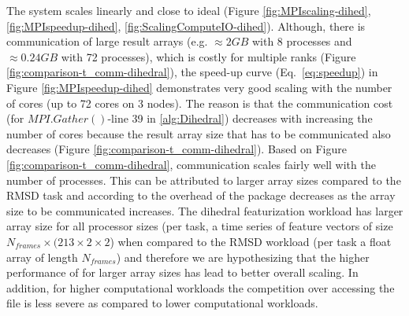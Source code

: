 The system scales linearly and close to ideal (Figure \ref{fig:MPIscaling-dihed}, \ref{fig:MPIspeedup-dihed}, \ref{fig:ScalingComputeIO-dihed}). Although, there is communication of large
result arrays (e.g. $\approx 2GB$ with 8 processes and $\approx 0.24GB$ with 72 processes), which is costly for multiple ranks (Figure \ref{fig:comparison-t_comm-dihedral}), the speed-up curve (Eq.~\ref{eq:speedup}) in Figure \ref{fig:MPIspeedup-dihed}
demonstrates very good scaling with the number of cores (up to 72 cores on 3 nodes).  The reason is that the communication cost (for
$MPI.Gather()$-line 39 in \ref{alg:Dihedral}) decreases with increasing the number of cores because the result array size that has to be
communicated also decreases (Figure \ref{fig:comparison-t_comm-dihedral}).  Based on Figure \ref{fig:comparison-t_comm-dihedral}, communication scales fairly well
with the number of processes. This can be attributed to larger array sizes compared to the RMSD task and according to \cite{Dalcin:2011aa}
the overhead of the  package decreases as the array size to be communicated increases. The dihedral featurization workload
has larger array size for all processor sizes (per task, a time series of feature vectors of size $N_{frames} \times (213 \times 2 \times 2$) when
compared to the RMSD workload (per task a float array of length $N_{frames}$) and therefore we are hypothesizing that the higher
performance of  for larger array sizes has lead to better overall scaling. 
In addition, for higher computational workloads the competition over accessing the file is less severe as compared to lower computational workloads. 
 
